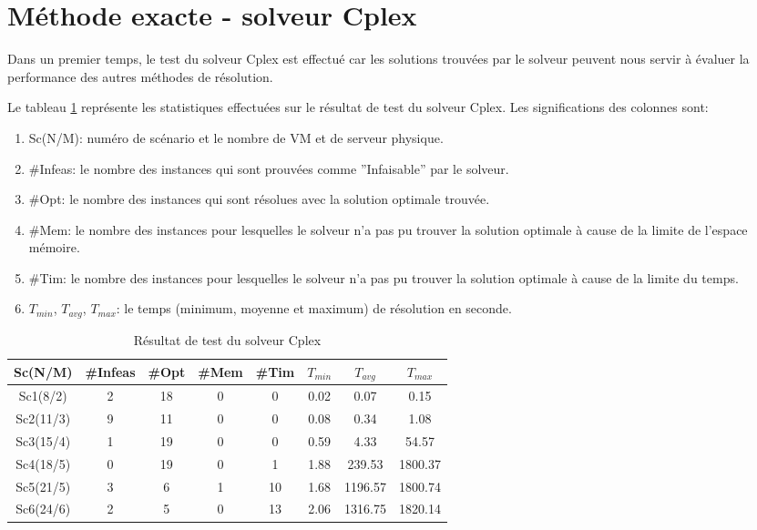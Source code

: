 \documentclass[twoside,fleqn]{EPURapport}
\begin{document}
\section{Méthode exacte - solveur Cplex}
Dans un premier temps, le test du solveur Cplex est effectué car les solutions trouvées par le solveur peuvent nous servir à évaluer la performance des autres méthodes de résolution.

Le tableau \ref{tab_cplex} représente les statistiques effectuées sur le résultat de test du solveur Cplex. Les significations des colonnes sont:
\begin{enumerate}
	\item Sc(N/M): numéro de scénario et le nombre de VM et de serveur physique.
	\item \#Infeas: le nombre des instances qui sont prouvées comme ''Infaisable'' par le solveur.
	\item \#Opt: le nombre des instances qui sont résolues avec la solution optimale trouvée.
	\item \#Mem: le nombre des instances pour lesquelles le solveur n'a pas pu trouver la solution optimale à cause de la limite de l'espace mémoire.
	\item \#Tim: le nombre des instances pour lesquelles le solveur n'a pas pu trouver la solution optimale à cause de la limite du temps.
	\item $T_{min}$, $T_{avg}$, $T_{max}$: le temps (minimum, moyenne et maximum) de résolution en seconde.
\end{enumerate}
\bigskip

\begin{table}[h]
    \centering
    \begin{tabular}{|c|c|c|c|c|c|c|c|}
    	\hline
    	Sc(N/M)	& \#Infeas & \#Opt	& \#Mem & \#Tim & $T_{min}$ & $T_{avg}$	& $T_{max}$ \\ \hline
		Sc1(8/2) & 2 & 18 & 0 & 0 &  0.02 &  0.07 &  0.15 \\ \hline
		Sc2(11/3) & 9 & 11 & 0 & 0 &  0.08 &  0.34 &  1.08 \\ \hline
		Sc3(15/4) & 1 & 19 & 0 & 0 &  0.59 &  4.33 &  54.57 \\ \hline
		Sc4(18/5) & 0 & 19 & 0 & 1 &  1.88 &  239.53 &  1800.37 \\ \hline
		Sc5(21/5) & 3 & 6 & 1 & 10 &  1.68 &  1196.57 &  1800.74 \\ \hline
		Sc6(24/6) & 2 & 5 & 0 & 13 &  2.06 &  1316.75 &  1820.14 \\	\hline
    \end{tabular}
    \caption{Résultat de test du solveur Cplex}
    \label{tab_cplex}
\end{table}
\bigskip
\end{document}
